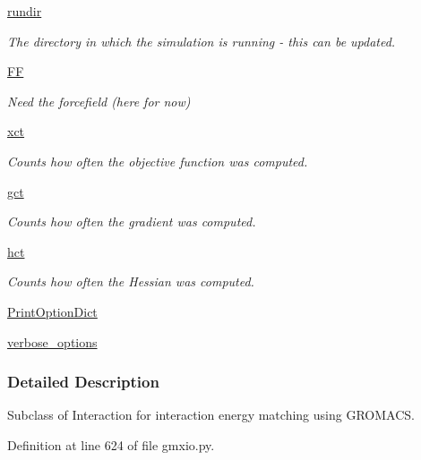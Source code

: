 \begin{DoxyCompactItemize}
\hyperlink{classforcebalance_1_1target_1_1Target_a6872de5b2d4273b82336ea5b0da29c9e}{rundir}
\begin{DoxyCompactList}\small\item\em The directory in which the simulation is running -\/ this can be updated. \end{DoxyCompactList}\item 
\hyperlink{classforcebalance_1_1target_1_1Target_a38a37919783141ea37fdcf8b00ce0aaf}{F\-F}
\begin{DoxyCompactList}\small\item\em Need the forcefield (here for now) \end{DoxyCompactList}\item 
\hyperlink{classforcebalance_1_1target_1_1Target_aad2e385cfbf7b4a68f1c2cb41133fe82}{xct}
\begin{DoxyCompactList}\small\item\em Counts how often the objective function was computed. \end{DoxyCompactList}\item 
\hyperlink{classforcebalance_1_1target_1_1Target_aa625ac88c6744eb14ef281d9496d0dbb}{gct}
\begin{DoxyCompactList}\small\item\em Counts how often the gradient was computed. \end{DoxyCompactList}\item 
\hyperlink{classforcebalance_1_1target_1_1Target_a5b5a42f78052b47f29ed4b940c6111a1}{hct}
\begin{DoxyCompactList}\small\item\em Counts how often the Hessian was computed. \end{DoxyCompactList}\item 
\hyperlink{classforcebalance_1_1baseclass_1_1ForceBalanceBaseClass_a5c55e661e746d1a4443f4e0bc34ebe05}{Print\-Option\-Dict}
\item 
\hyperlink{classforcebalance_1_1baseclass_1_1ForceBalanceBaseClass_a8088e1e20cbd6bc175fb9c9fe9fa0f18}{verbose\-\_\-options}
\end{DoxyCompactItemize}


\subsubsection{Detailed Description}
Subclass of Interaction for interaction energy matching using G\-R\-O\-M\-A\-C\-S. 



Definition at line 624 of file gmxio.\-py.



